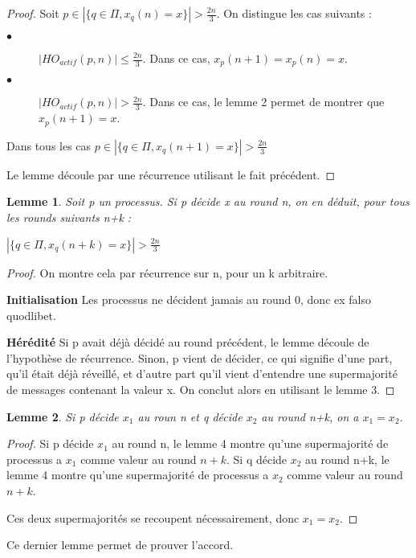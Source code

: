\documentclass{article}
\newtheorem{lemma}{Lemme}
\begin{document}
\begin{proof}

Soit $p \in | \{ q \in \Pi , x_q(n) = x \} | > \frac{2n}{3}$. On distingue les cas suivants :

\begin{description}

\item[$\bullet$] $|HO_{actif} (p, n) | \leq \frac{2n}{3}$. Dans ce cas, $x_p(n+1) = x_p(n) = x$.
\item[$\bullet$] $|HO_{actif} (p, n) | > \frac{2n}{3}$. Dans ce cas, le lemme 2 permet de montrer que $x_p(n+1) = x$.

\end{description}
Dans tous les cas 
$p \in | \{ q \in \Pi , x_q(n+1) = x \} | > \frac{2n}{3}$

Le lemme découle par une récurrence utilisant le fait précédent.
\end{proof}
\begin{lemma}

Soit p un processus. Si p décide x au round n, on en déduit, pour tous les rounds suivants n+k :

$| \{ q \in \Pi , x_q(n+k) = x \} | > \frac{2n}{3}$
\end{lemma}
\begin{proof}

On montre cela par récurrence sur n, pour un k arbitraire.

\textbf{Initialisation}
Les processus ne décident jamais au round 0, donc ex falso quodlibet.

\textbf{Hérédité}
Si p avait déjà décidé au round précédent, le lemme découle de l'hypothèse de récurrence.
Sinon, p vient de décider, ce qui signifie d'une part, qu'il était déjà réveillé, et d'autre part
qu'il vient d'entendre une supermajorité de messages contenant la valeur x.
On conclut alors en utilisant le lemme 3.

\end{proof}
\begin{lemma}

Si p décide $x_1$ au roun n et q décide $x_2$ au round n+k, on a $x_1 = x_2$.
\end{lemma}
\begin{proof}

Si p décide $x_1$ au round n,   le lemme 4 montre qu'une supermajorité de processus a $x_1$ comme valeur au round $n+k$.
Si q décide $x_2$ au round n+k, le lemme 4 montre qu'une supermajorité de processus a $x_2$ comme valeur au round $n+k$.

Ces deux supermajorités se recoupent nécessairement, donc $x_1 = x_2$.
\end{proof}

Ce dernier lemme permet de prouver l'accord.
\end{document}
